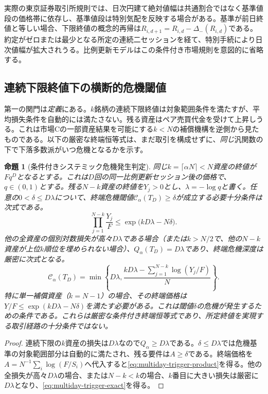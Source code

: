 \documentclass[11pt]{article}
\numberwithin{equation}{section}
\newtheorem{proposition}[theorem]{命題}
\theoremstyle{definition}
\theoremstyle{remark}
\newcommand{\Cris}{\mathcal{C}}
\begin{document}
実際の東京証券取引所規則では、日次円建て絶対値幅は共通割合ではなく基準値段の価格帯に依存し、基準値段は特別気配を反映する場合がある。基準が前日終値と等しい場合、下限終値の概念的再帰は$R_{i,d+1}=R_{i,d}-\Delta_-(R_{i,d})$である。約定がゼロまたは最少となる所定の連続二セッションを経て、特別手続により日次値幅が拡大されうる\citep{JPX2026}。比例更新モデルはこの条件付き市場規則を意図的に省略する。


\subsection{連続下限終値下の横断的危機閾値}\label{subsec:multiday-breadth}
第一の関門は\emph{定義}にある。$k$銘柄の連続下限終値は対象範囲条件を満たすが、平均損失条件を自動的には満たさない。残る資産はペア売買代金を受けて上昇しうる。これは市場Cの一部資産結果を可能にする$k<N$の補償機構を逆側から見たものである。以下の厳密な終端恒等式は、まだ取引を構成せずに、\emph{同じ}汎関数の下で下落多数派がいつ危機となるかを示す。
\begin{proposition}[条件付きシステミック危機発生判定]\label{prop:multiday-crisis-trigger}
同じ$k=\lceil\alpha N\rceil<N$資産の終値が$Fq^D$となるとする。これは$D$回の同一比例更新セッション後の価格で、$q\in(0,1)$とする。残る$N-k$資産の終値を$Y_j>0$とし、$\lambda=-\log q$と書く。任意の$0<\delta\le D\lambda$について、\emph{終端}危機閾値$\Cris_\alpha(T_D)\ge\delta$が成立する必要十分条件は次式である。
\begin{equation}\label{eq:multiday-trigger-product}
\boxed{\qquad \prod_{j=1}^{N-k}\frac{Y_j}{F}
 \le\exp\bigl(kD\lambda-N\delta\bigr).\qquad}
\end{equation}
他の全資産の個別対数損失が高々$D\lambda$である場合（または$k>N/2$で、他の$N-k$資産が上位$k$順位を埋められない場合）、$Q_\alpha(T_D)=D\lambda$であり、終端危機深度は厳密に次式となる。
\begin{equation}\label{eq:multiday-trigger-exact}
\boxed{\quad\Cris_\alpha(T_D)=\min\!\left\{D\lambda,
 \frac{kD\lambda-\sum_{j=1}^{N-k}\log(Y_j/F)}{N}\right\}.\quad}
\end{equation}
特に単一補償資産（$k=N-1$）の場合、その終端価格は$Y/F\le\exp(kD\lambda-N\delta)$を満たす必要がある。これは閾値$\delta$の危機が発生するための条件である。これらは厳密な\emph{条件付き終端恒等式}であり、所定終値を実現する取引経路の十分条件ではない。
\end{proposition}
\begin{proof}
連続下限の$k$資産の損失は$D\lambda$なので$Q_\alpha\ge D\lambda$である。$\delta\le D\lambda$では危機基準の対象範囲部分は自動的に満たされ、残る要件は$A\ge\delta$である。終端価格を$A=N^{-1}\sum_i\log(F/S_i)$へ代入すると\eqref{eq:multiday-trigger-product}を得る。他の全損失が高々$D\lambda$の場合、または$N-k<k$の場合、$k$番目に大きい損失は厳密に$D\lambda$となり、\eqref{eq:multiday-trigger-exact}を得る。
\end{proof}
\end{document}
